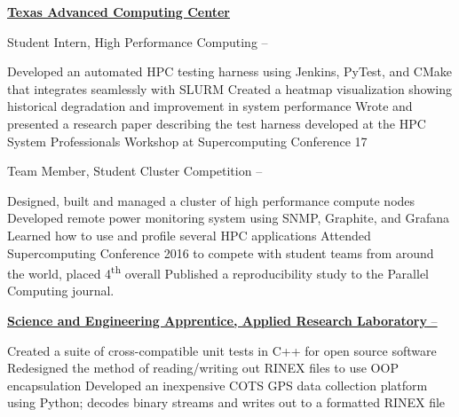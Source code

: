 \documentclass[letterpaper,MMMyyyy,nonstopmode]{simpleresumecv}
\begin{document}
\begin{Body}
\BigGap

\Entry
\href{http://tacc.utexas.edu}
{\textbf{Texas Advanced Computing Center}}

\Gap
\BulletItem
Student Intern, High Performance Computing
\hfill
{} --
\begin{Detail}
\SubBulletItem
Developed an automated HPC testing harness using Jenkins, PyTest, and \newline
  CMake that integrates seamlessly with SLURM
\SubBulletItem
Created a heatmap visualization showing historical degradation \newline
  and improvement in system performance
\SubBulletItem
Wrote and presented a research paper describing the test harness developed at
  \newline the HPC System Professionals Workshop at Supercomputing Conference 17
\end{Detail}

\Gap
\BulletItem
Team Member, Student Cluster Competition
\hfill
{} --
\begin{Detail}
\SubBulletItem
Designed, built and managed a cluster of high performance compute nodes
\SubBulletItem
Developed remote power monitoring system using SNMP, Graphite, \newline and
  Grafana
\SubBulletItem
Learned how to use and profile several HPC applications
\SubBulletItem
Attended Supercomputing Conference 2016 to compete with student teams \newline
  from around the world, placed 4\textsuperscript{th} overall
\SubBulletItem
Published a reproducibility study to the Parallel Computing journal.
\end{Detail}

\BigGap

\Entry
\href{http://arlut.utexas.edu}
{\textbf{Science and Engineering Apprentice, Applied Research Laboratory}
  \hfill
   --
  }
\begin{Detail}
\BulletItem
Created a suite of cross-compatible unit tests in C++ for open source software
\BulletItem
Redesigned the method of reading/writing out RINEX files to use OOP \newline
  encapsulation
\BulletItem
Developed an inexpensive COTS GPS data collection platform using \newline
  Python; decodes binary streams and writes out to a formatted RINEX file
\end{Detail}



\end{Body}
\end{document}
